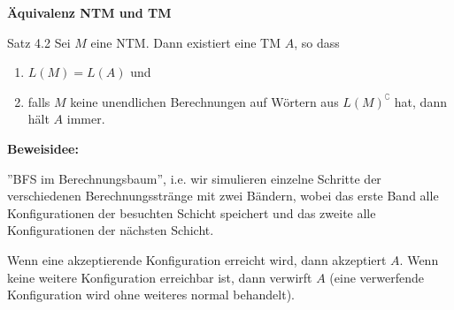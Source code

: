         
        
            \textbf{Äquivalenz NTM und TM}
            \begin{mainbox}{Satz 4.2}
                Sei $M$ eine NTM. Dann existiert eine TM $A$, so dass 
                \begin{enumerate}[label=(\roman*)]
                    \item $L(M) = L(A)$ und 
                    \item falls $M$ keine unendlichen Berechnungen auf Wörtern aus $L(M)^\complement$ hat, dann hält $A$ immer.
                \end{enumerate}
            \end{mainbox}
            \textbf{Beweisidee:} 
            
            ''BFS im Berechnungsbaum'', i.e. wir simulieren einzelne Schritte der verschiedenen Berechnungsstränge mit 
            zwei Bändern, wobei das erste Band alle Konfigurationen der besuchten Schicht speichert und das zweite 
            alle Konfigurationen der nächsten Schicht.

            Wenn eine akzeptierende Konfiguration erreicht wird, dann akzeptiert $A$. 
            Wenn keine weitere Konfiguration erreichbar ist, dann verwirft $A$ (eine verwerfende Konfiguration wird ohne weiteres normal behandelt). 
        
        
